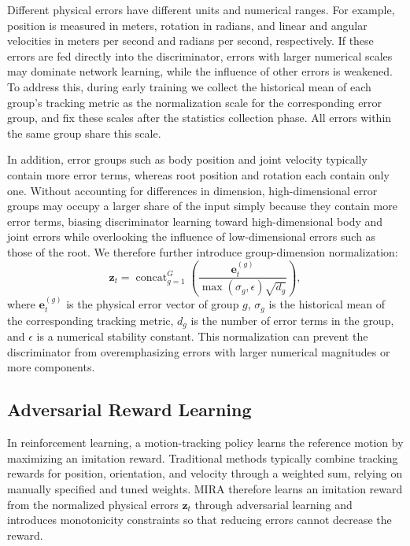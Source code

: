 \documentclass[letterpaper, 10pt, conference]{ieeeconf}
\begin{document}
Different physical errors have different units and numerical ranges. For
example, position is measured in meters, rotation in radians, and linear
and angular velocities in meters per second and radians per second,
respectively. If these errors are fed directly into the discriminator,
errors with larger numerical scales may dominate network learning, while
the influence of other errors is weakened. To address this, during early
training we collect the historical mean of each group's tracking metric
as the normalization scale for the corresponding error group, and fix
these scales after the statistics collection phase. All errors within
the same group share this scale.

In addition, error groups such as body position and joint velocity
typically contain more error terms, whereas root position and rotation
each contain only one. Without accounting for differences in dimension,
high-dimensional error groups may occupy a larger share of the input
simply because they contain more error terms, biasing discriminator
learning toward high-dimensional body and joint errors while overlooking
the influence of low-dimensional errors such as those of the root. We
therefore further introduce group-dimension normalization:
\begin{equation}
\mathbf z_t =
\operatorname{concat}_{g=1}^{G}
\left(
\frac{\mathbf e_t^{(g)}}
{\max(\sigma_g,\epsilon)\sqrt{d_g}}
\right),
\label{eq:physical_normalization}
\end{equation}
where $\mathbf e_t^{(g)}$ is the physical error vector of group $g$,
$\sigma_g$ is the historical mean of the corresponding tracking metric,
$d_g$ is the number of error terms in the group, and $\epsilon$ is a
numerical stability constant. This normalization can prevent the
discriminator from overemphasizing errors with larger numerical
magnitudes or more components.

\subsection{Adversarial Reward Learning}
\label{sec:reward}

In reinforcement learning, a motion-tracking policy learns the reference
motion by maximizing an imitation reward. Traditional methods typically
combine tracking rewards for position, orientation, and velocity through
a weighted sum, relying on manually specified and tuned weights. MIRA
therefore learns an imitation reward from the normalized physical errors
$\mathbf z_t$ through adversarial learning and introduces monotonicity
constraints so that reducing errors cannot decrease the reward.
\end{document}

